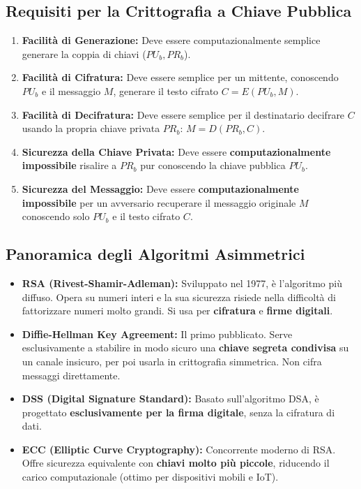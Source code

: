 
\subsection{Requisiti per la Crittografia a Chiave Pubblica}

\begin{enumerate}
    \item \textbf{Facilità di Generazione:} Deve essere computazionalmente semplice generare la coppia di chiavi ($PU_b, PR_b$).
    \item \textbf{Facilità di Cifratura:} Deve essere semplice per un mittente, conoscendo $PU_b$ e il messaggio $M$, generare il testo cifrato $C = E(PU_b, M)$.
    \item \textbf{Facilità di Decifratura:} Deve essere semplice per il destinatario decifrare $C$ usando la propria chiave privata $PR_b$: $M = D(PR_b, C)$.
    \item \textbf{Sicurezza della Chiave Privata:} Deve essere \textbf{computazionalmente impossibile} risalire a $PR_b$ pur conoscendo la chiave pubblica $PU_b$.
    \item \textbf{Sicurezza del Messaggio:} Deve essere \textbf{computazionalmente impossibile} per un avversario recuperare il messaggio originale $M$ conoscendo solo $PU_b$ e il testo cifrato $C$.
\end{enumerate}

\subsection{Panoramica degli Algoritmi Asimmetrici}
\begin{itemize}
    \item \textbf{RSA (Rivest-Shamir-Adleman):} Sviluppato nel 1977, è l'algoritmo più diffuso. Opera su numeri interi e la sua sicurezza risiede nella difficoltà di fattorizzare numeri molto grandi. Si usa per \textbf{cifratura} e \textbf{firme digitali}.
    \item \textbf{Diffie-Hellman Key Agreement:} Il primo pubblicato. Serve esclusivamente a stabilire in modo sicuro una \textbf{chiave segreta condivisa} su un canale insicuro, per poi usarla in crittografia simmetrica. Non cifra messaggi direttamente.
    \item \textbf{DSS (Digital Signature Standard):} Basato sull'algoritmo DSA, è progettato \textbf{esclusivamente per la firma digitale}, senza la cifratura di dati.
    \item \textbf{ECC (Elliptic Curve Cryptography):} Concorrente moderno di RSA. Offre sicurezza equivalente con \textbf{chiavi molto più piccole}, riducendo il carico computazionale (ottimo per dispositivi mobili e IoT).
\end{itemize}


